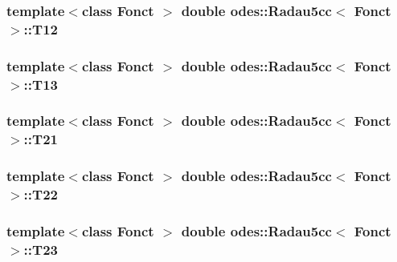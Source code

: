\hypertarget{classodes_1_1Radau5cc_ac47257f4b685d8016d8bdc0aaf6c3861}{
\subsubsection[{T12}]{\setlength{\rightskip}{0pt plus 5cm}template$<$class Fonct $>$ double {\bf odes\-::\-Radau5cc}$<$ Fonct $>$\-::T12\hspace{0.3cm}{\ttfamily [private]}}}\label{classodes_1_1Radau5cc_ac47257f4b685d8016d8bdc0aaf6c3861}
\hypertarget{classodes_1_1Radau5cc_a49b429abb614b8d4f41e6df611a12c06}{
\subsubsection[{T13}]{\setlength{\rightskip}{0pt plus 5cm}template$<$class Fonct $>$ double {\bf odes\-::\-Radau5cc}$<$ Fonct $>$\-::T13\hspace{0.3cm}{\ttfamily [private]}}}\label{classodes_1_1Radau5cc_a49b429abb614b8d4f41e6df611a12c06}
\hypertarget{classodes_1_1Radau5cc_a5933359813b622b1dd1f67605df31521}{
\subsubsection[{T21}]{\setlength{\rightskip}{0pt plus 5cm}template$<$class Fonct $>$ double {\bf odes\-::\-Radau5cc}$<$ Fonct $>$\-::T21\hspace{0.3cm}{\ttfamily [private]}}}\label{classodes_1_1Radau5cc_a5933359813b622b1dd1f67605df31521}
\hypertarget{classodes_1_1Radau5cc_a1c4adb6f7b47032fe75bd53884a37ef3}{
\subsubsection[{T22}]{\setlength{\rightskip}{0pt plus 5cm}template$<$class Fonct $>$ double {\bf odes\-::\-Radau5cc}$<$ Fonct $>$\-::T22\hspace{0.3cm}{\ttfamily [private]}}}\label{classodes_1_1Radau5cc_a1c4adb6f7b47032fe75bd53884a37ef3}
\hypertarget{classodes_1_1Radau5cc_a7a1d50f08a07a822568cbe9d52b75d45}{
\subsubsection[{T23}]{\setlength{\rightskip}{0pt plus 5cm}template$<$class Fonct $>$ double {\bf odes\-::\-Radau5cc}$<$ Fonct $>$\-::T23\hspace{0.3cm}{\ttfamily [private]}}}\label{classodes_1_1Radau5cc_a7a1d50f08a07a822568cbe9d52b75d45}
